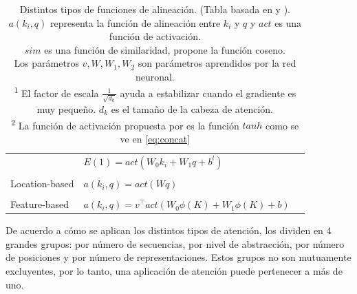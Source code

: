 \begin{table}[ht!]
\begin{center}
{\begin{tabular}{@{}lll@{}}
    & $E(1) = act(W_0k_i + W_1q + b^l)$ &  \\ \\
Location-based & $a(k_i, q) = act(W q)$ & \citeauthor{DBLP:journals/corr/LuongPM15} \\ \\
Feature-based & $a(k_i, q) = v^\top act(W_0 \phi(K) + W_1 \phi(K) + b)$ & \citeauthor{DBLP:journals/corr/abs-1810-10126} \\
\bottomrule
\end{tabular}}
\end{center}
\caption{Distintos tipos de funciones de alineación. (Tabla basada en \cite{DBLP:journals/corr/abs-1904-02874} y \cite{weng2018attention}). \\
$a(k_i, q)$ representa la función de alineación entre $k_i$ y $q$ y $act$ es una función de activación. \\
$sim$ es una función de similaridad, \citeauthor{DBLP:journals/corr/GravesWD14} propone la función coseno.\\
Los parámetros $v, W, W_1, W_2$ son parámetros aprendidos por la red neuronal.\\
\textsuperscript{1} El factor de escala $\frac{1}{\sqrt{d_k}}$ ayuda a estabilizar cuando el
gradiente es muy pequeño. $d_k$ es el tamaño de la cabeza de atención.\\
\textsuperscript{2} La función de activación propuesta por \citeauthor{bahdanau2016neural} es la función $tanh$ como se ve en \ref{eq:concat} \\
\label{Tab:att}}
\end{table}

De acuerdo a cómo se aplican los distintos tipos de atención, \citeauthor{DBLP:journals/corr/abs-1904-02874}
los dividen en 4 grandes grupos: por número de secuencias, por nivel de abstracción, por número de
posiciones y por número de representaciones. Estos grupos no son mutuamente excluyentes, por lo tanto,
una aplicación de atención puede pertenecer a más de uno.

